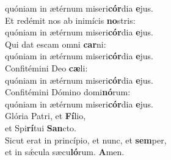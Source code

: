 \evenverse quóniam in ætérnum miseri\textbf{cór}dia \textbf{e}jus.\\
\oddverse Et redémit nos ab inimícis \textbf{no}stris:~\*\\
\oddverse quóniam in ætérnum miseri\textbf{cór}dia \textbf{e}jus.\\
\evenverse Qui dat escam omni \textbf{car}ni:~\*\\
\evenverse quóniam in ætérnum miseri\textbf{cór}dia \textbf{e}jus.\\
\oddverse Confitémini Deo \textbf{cæ}li:~\*\\
\oddverse quóniam in ætérnum miseri\textbf{cór}dia \textbf{e}jus.\\
\evenverse Confitémini Dómino domi\textbf{nó}rum:~\*\\
\evenverse quóniam in ætérnum miseri\textbf{cór}dia \textbf{e}jus.\\
\oddverse Glória Patri, et \textbf{Fí}lio,~\*\\
\oddverse et Spi\textbf{rí}tui \textbf{San}cto.\\
\evenverse Sicut erat in princípio, et nunc, et \textbf{sem}per,~\*\\
\evenverse et in sǽcula sæcu\textbf{ló}rum. \textbf{A}men.\\
